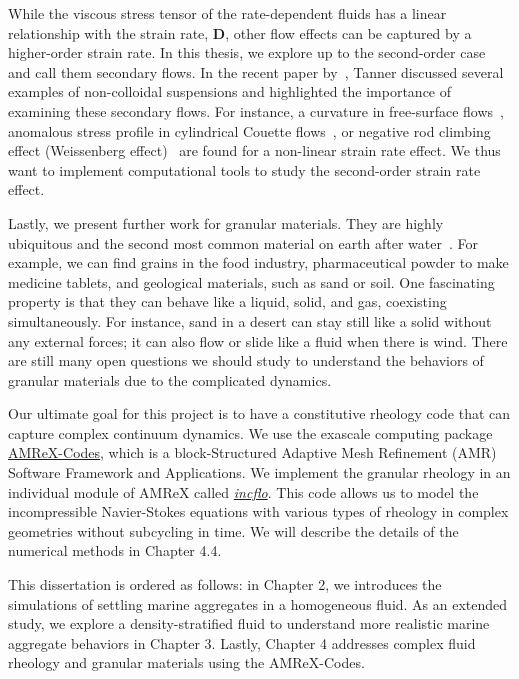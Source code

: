 \par
While the viscous stress tensor of the rate-dependent fluids has a linear relationship with the strain rate, $\bm D$, other flow effects can be captured by a higher-order strain rate. 
In this thesis, we explore up to the second-order case and call them secondary flows.
In the recent paper by~\cite{tanner_review_2018}, Tanner discussed several examples of non-colloidal suspensions and highlighted the importance of examining these secondary flows.
For instance, a curvature in free-surface flows~\cite{couturier_suspensions_2011}, anomalous stress profile in cylindrical Couette flows~\cite{krishnaraj_dilation-driven_2016}, or negative rod climbing effect (Weissenberg effect)~\cite{boyer_dense_2011} are found for a non-linear strain rate effect. We thus want to implement computational tools to study the second-order strain rate effect.
\par
Lastly, we present further work for granular materials.
They are highly ubiquitous and the second most common material on earth after water~\cite{richard_slow_2005}. 
For example, we can find grains in the food industry, pharmaceutical powder to make medicine tablets, and geological materials, such as sand or soil.
One fascinating property is that they can behave like a liquid, solid, and gas, coexisting simultaneously. For instance, sand in a desert can stay still like a solid without any external forces; it can also flow or slide like a fluid when there is wind.
There are still many open questions we should study to understand the behaviors of granular materials due to the complicated dynamics.
\par
Our ultimate goal for this project is to have a constitutive rheology code that can capture complex continuum dynamics. 
We use the exascale computing package \href{https://amrex-codes.github.io/index.html}{{\color{blue}AMReX-Codes}}, which is a block-Structured Adaptive Mesh Refinement (AMR) Software Framework and Applications. We implement the granular rheology in an individual module of AMReX called \href{https://amrex-codes.github.io/incflo/}{{\color{blue}\textit{incflo}}}. This code allows us to model the incompressible Navier-Stokes equations with various types of rheology in complex geometries without subcycling in time. 
We will describe the details of the numerical methods in Chapter 4.4.
\par
This dissertation is ordered as follows: in Chapter 2, we introduces the simulations of settling marine aggregates in a homogeneous fluid. As an extended study, we explore a density-stratified fluid to understand more realistic marine aggregate behaviors in Chapter 3. Lastly, Chapter 4 addresses complex fluid rheology and granular materials using the AMReX-Codes.





